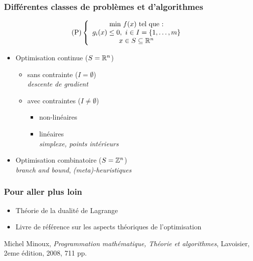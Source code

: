 \documentclass{beamer}
\newcommand{\Z}{{\ensuremath\mathbb{Z}}}
\newcommand{\R}{{\ensuremath\mathbb{R}}}
\begin{document}
\begin{frame}
  \frametitle{Différentes classes de problèmes et d'algorithmes}

  \[
  \text{(P)} \left\{
  \begin{array}{c}
    \text{min} \ f(x) \ \text{tel que :} \\
    g_i(x) \leq 0, \ i \in I = \{1, \dots, m\} \\
    x \in S \subseteq \R^n
  \end{array}
  \right.
  \]

  \begin{itemize}
  \item Optimisation continue ($S = \R^n$)
    \begin{itemize}
    \item sans contrainte ($I = \emptyset$) \\
      \emph{descente de gradient}
    \item avec contraintes ($I \neq \emptyset$) 
      \begin{itemize}
        \item non-linéaires
        \item linéaires \\
        \emph{simplexe, points intérieurs}
      \end{itemize}
    \end{itemize}
  \item Optimisation combinatoire ($S = \Z^n$)\\
    \emph{branch and bound}, \emph{(meta)-heuristiques} 
  \end{itemize}
  
\end{frame}

\begin{frame}
  \frametitle{Pour aller plus loin}

  \begin{itemize}
  \item Théorie de la dualité de Lagrange
  \end{itemize}


  \begin{itemize}
  \item Livre de référence sur les aspects théoriques de l'optimisation
  \end{itemize}

\begin{thebibliography}{alpha}
Michel Minoux, \emph{Programmation mathématique, Théorie et algorithmes}, Lavoisier, 2eme édition, 2008, 711 pp.
\end{thebibliography}

\end{frame}
\end{document}

